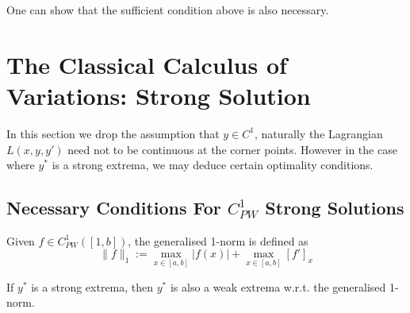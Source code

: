 \begin{remark}
	One can show that the sufficient condition above is also necessary. 
\end{remark}



\section{The Classical Calculus of Variations: Strong Solution}
In this section we drop the assumption that $y \in C^1$, naturally the Lagrangian $L(x, y, y')$ need not to be continuous at the corner points. However in the case where $y^*$ is a strong extrema, we may deduce certain optimality conditions. 

\subsection{Necessary Conditions For \texorpdfstring{$C_{PW}^1$}{C1\_PW} Strong Solutions}
\begin{definition}
	Given $f \in C_{PW}^1([1, b])$, the generalised 1-norm is defined as
	\begin{equation}
		\|f \|_1 := \max_{ x \in [a, b]} |f(x)| + \max_{x \in [a, b]} [f']_x
	\end{equation}
\end{definition}
\begin{remark}
If $y^*$ is a strong extrema, then $y^*$ is also a weak extrema w.r.t. the generalised 1-norm. 	
\end{remark}


